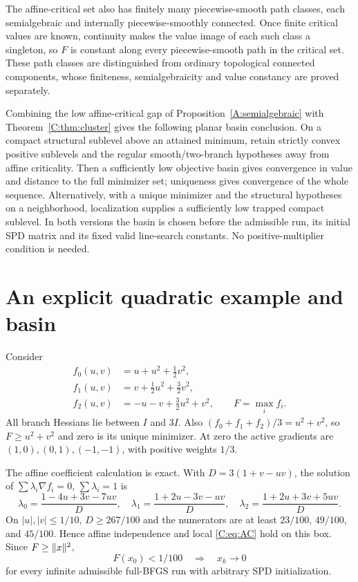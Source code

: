 The affine-critical set also has finitely many piecewise-smooth path classes, each semialgebraic and internally piecewise-smoothly connected. Once finite critical values are known, continuity makes the value image of each such class a singleton, so $F$ is constant along every piecewise-smooth path in the critical set. These path classes are distinguished from ordinary topological connected components, whose finiteness, semialgebraicity and value constancy are proved separately.

Combining the low affine-critical gap of Proposition~\ref{A:semialgebraic} with Theorem~\ref{C:thm:cluster} gives the following planar basin conclusion. On a compact structural sublevel above an attained minimum, retain strictly convex positive sublevels and the regular smooth/two-branch hypotheses away from affine criticality. Then a sufficiently low objective basin gives convergence in value and distance to the full minimizer set; uniqueness gives convergence of the whole sequence. Alternatively, with a unique minimizer and the structural hypotheses on a neighborhood, localization supplies a sufficiently low trapped compact sublevel. In both versions the basin is chosen before the admissible run, its initial SPD matrix and its fixed valid line-search constants. No positive-multiplier condition is needed.


\setcounter{section}{7}
\setcounter{theorem}{7}
\setcounter{equation}{16}


\section{An explicit quadratic example and basin}

Consider
\[\begin{aligned}
 f_0(u,v)&=u+u^2+\tfrac12v^2,\\
 f_1(u,v)&=v+\tfrac12u^2+\tfrac32v^2,\\
 f_2(u,v)&=-u-v+\tfrac32u^2+v^2,\qquad F=\max_i f_i.
\end{aligned}\]
All branch Hessians lie between $I$ and $3I$. Also $(f_0+f_1+f_2)/3=u^2+v^2$, so $F\ge u^2+v^2$ and zero is its unique minimizer. At zero the active gradients are $(1,0),(0,1),(-1,-1)$, with positive weights $1/3$.

The affine coefficient calculation is exact. With $D=3(1+v-uv)$, the solution of $\sum\lambda_i\nabla f_i=0$, $\sum\lambda_i=1$ is
\[
 \lambda_0=\frac{1-4u+3v-7uv}{D},\quad
 \lambda_1=\frac{1+2u-3v-uv}{D},\quad
 \lambda_2=\frac{1+2u+3v+5uv}{D}.
\]
On $|u|,|v|\le1/10$, $D\ge267/100$ and the numerators are at least $23/100$, $49/100$, and $45/100$. Hence affine independence and local \eqref{C:eq:AC} hold on this box. Since $F\ge\lVert x\rVert^2$,
\begin{equation}\label{C:eq:explicitbasin}
 \boxed{F(x_0)<1/100\quad\Longrightarrow\quad x_k\to0}
\end{equation}
for every infinite admissible full-BFGS run with arbitrary SPD initialization.

